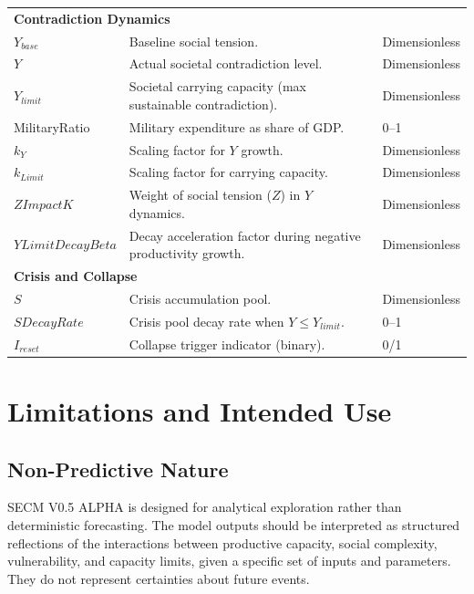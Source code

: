 \documentclass[12pt,a4paper]{article}
\begin{document}
\begin{longtable}{p{3cm} p{9cm} p{3cm}}
\multicolumn{3}{l}{\textbf{Contradiction Dynamics}} \\
$Y_{base}$            & Baseline social tension. & Dimensionless \\
$Y$                   & Actual societal contradiction level. & Dimensionless \\
$Y_{limit}$           & Societal carrying capacity (max sustainable contradiction). & Dimensionless \\
MilitaryRatio         & Military expenditure as share of GDP. & 0–1 \\
$k_Y$                 & Scaling factor for $Y$ growth. & Dimensionless \\
$k_{Limit}$           & Scaling factor for carrying capacity. & Dimensionless \\
$ZImpactK$            & Weight of social tension ($Z$) in $Y$ dynamics. & Dimensionless \\
$YLimitDecayBeta$     & Decay acceleration factor during negative productivity growth. & Dimensionless \\

\multicolumn{3}{l}{\textbf{Crisis and Collapse}} \\
$S$                   & Crisis accumulation pool. & Dimensionless \\
$SDecayRate$          & Crisis pool decay rate when $Y \leq Y_{limit}$. & 0–1 \\
$I_{reset}$           & Collapse trigger indicator (binary). & 0/1 \\

\hline
\end{longtable}


\section{Limitations and Intended Use}

\subsection{Non-Predictive Nature}
SECM V0.5 ALPHA is designed for analytical exploration rather than deterministic forecasting. The model outputs should be interpreted as structured reflections of the interactions between productive capacity, social complexity, vulnerability, and capacity limits, given a specific set of inputs and parameters. They do not represent certainties about future events.
\end{document}
